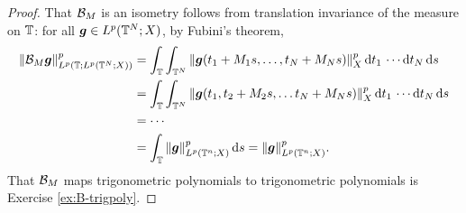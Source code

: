 \begin{proof}
  That $\mathcal{B}_{M}$ is an isometry follows from translation invariance of the measure on $\mathbb{T}$: for all $\bm{g} \in L^p(\mathbb{T}^{N};X)$, by Fubini's theorem,
  \begin{equation*}
    \begin{aligned}
      \|\mathcal{B}_{M} \bm{g} \|_{L^p(\mathbb{T};L^p(\mathbb{T}^{N};X))}^{p}
      &=\int_{\mathbb{T}} \int_{\mathbb{T}^{N}} \|\bm{g}(t_{1} + M_{1} s, \ldots, t_{N} + M_{N} s )\|_{X}^{p} \, \mathrm{d} t_{1} \, \cdots \mathrm{d} t_{N} \, \mathrm{d} s \\
      &= \int_{\mathbb{T}} \int_{\mathbb{T}^{N}} \|\bm{g}(t_{1}, t_{2} + M_{2} s, \ldots t_{N} + M_{N} s )\|_{X}^{p} \, \mathrm{d} t_{1} \, \cdots \mathrm{d} t_{N} \, \mathrm{d} s \\
      &= \cdots \\
      &= \int_{\mathbb{T}} \|\bm{g}\|_{L^p(\mathbb{T}^{n};X)}^{p} \, \mathrm{d} s = \|\bm{g}\|_{L^p(\mathbb{T}^{n};X)}^{p}.
    \end{aligned}
  \end{equation*}
  That $\mathcal{B}_{M}$ maps trigonometric polynomials to trigonometric polynomials is Exercise \ref{ex:B-trigpoly}.
  

\end{proof}
